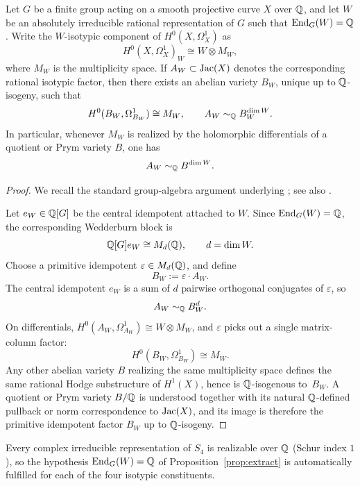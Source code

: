 \begin{proposition}\label{prop:extract}
Let \(G\) be a finite group acting on a smooth projective curve \(X\) over \(\mathbb{Q}\), and let \(W\) be an absolutely irreducible rational representation of \(G\) such that \(\operatorname{End}_G(W)=\mathbb{Q}\). Write the \(W\)-isotypic component of \(H^0(X,\Omega_X^1)\) as
\[
H^0(X,\Omega_X^1)_W\cong W\otimes M_W,
\]
where \(M_W\) is the multiplicity space.
If \(A_W\subset \operatorname{Jac}(X)\) denotes the corresponding rational isotypic factor, then there exists an abelian variety \(B_W\), unique up to \(\mathbb{Q}\)-isogeny, such that
\[
H^0(B_W,\Omega_{B_W}^1)\cong M_W,
\qquad
A_W\sim_{\mathbb{Q}} B_W^{\dim W}.
\]
In particular, whenever \(M_W\) is realized by the holomorphic differentials of a quotient or Prym variety \(B\), one has
\[
A_W\sim_{\mathbb{Q}} B^{\dim W}.
\]
\end{proposition}

\begin{proof}
We recall the standard group-algebra argument underlying \cite{KaniRosen1989}; see also \cite[Section~13.4]{BirkenhakeLange2004}.

Let \(e_W\in \mathbb{Q}[G]\) be the central idempotent attached to \(W\). Since \(\operatorname{End}_G(W)=\mathbb{Q}\), the corresponding Wedderburn block is
\[
\mathbb{Q}[G]e_W\cong M_d(\mathbb{Q}),\qquad d=\dim W.
\]
Choose a primitive idempotent \(\varepsilon\in M_d(\mathbb{Q})\), and define
\[
B_W:=\varepsilon\cdot A_W.
\]
The central idempotent \(e_W\) is a sum of \(d\) pairwise orthogonal conjugates of \(\varepsilon\), so
\[
A_W\sim_{\mathbb{Q}} B_W^d.
\]
On differentials, \(H^0(A_W,\Omega_{A_W}^1)\cong W\otimes M_W\), and \(\varepsilon\) picks out a single matrix-column factor:
\[
H^0(B_W,\Omega_{B_W}^1)\cong M_W.
\]
Any other abelian variety \(B\) realizing the same multiplicity space defines the same rational Hodge substructure of \(H^1(X)\), hence is \(\mathbb{Q}\)-isogenous to~\(B_W\). A quotient or Prym variety \(B/\mathbb{Q}\) is understood together with its natural \(\mathbb{Q}\)-defined pullback or norm correspondence to \(\operatorname{Jac}(X)\), and its image is therefore the primitive idempotent factor \(B_W\) up to \(\mathbb{Q}\)-isogeny.
\end{proof}

\begin{remark}\label{rem:schur}
Every complex irreducible representation of \(S_4\) is realizable over \(\mathbb{Q}\) (Schur index \(1\)), so the hypothesis \(\operatorname{End}_G(W)=\mathbb{Q}\) of Proposition~\ref{prop:extract} is automatically fulfilled for each of the four isotypic constituents.
\end{remark}


